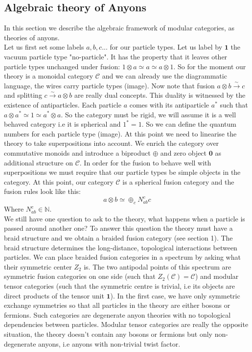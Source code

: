 \documentclass{article}
\begin{document}
\subsection{Algebraic theory of Anyons}
In this section we describe the algebraic framework of modular categories, as theories of anyons. \\
Let us first set some labels $a,b,c...$ for our particle types. Let us label by $\mathbf{1}$ the vacuum particle type "no-particle". It has the property that it leaves other particle types unchanged under fusion: $1 \otimes a \simeq a \simeq a \otimes 1$. So for the moment our theory is a monoidal category $\mathcal{C}$ and we can already use the diagrammatic language, the wires carry particle types (image). Now note that fusion $a \otimes b \xrightarrow{\sim} c$ and splitting $c \xrightarrow{\sim} a \otimes b$ are really dual concepts. This duality is witnessed by the existence of antiparticles. Each particle $a$ comes with its antiparticle $a^*$ such that $a\otimes a^* \simeq 1 \simeq a^* \otimes a$. So the category must be rigid, we will assume it is a well behaved category i.e it is spherical and $1^*=1$. So we can define the quantum numbers for each particle type (image). At this point we need to linearise the theory to take superpositions into account. We enrich the category over commutative monoids and introduce a biproduct $\oplus$ and zero object $\mathbf{0}$ as additional structure on $\mathcal{C}$. In order for the fusion to behave well with superpositions we must require that our particle types be simple objects in the category. At this point, our category $\mathcal{C}$ is a spherical fusion category and the fusion rules look like this:
\begin{equation}
a\otimes b \simeq \oplus_c N_{ab}^c c
\end{equation}
Where $N_{ab}^c \in \mathbb{N}$. \\
We still have one question to ask to the theory, what happens when a particle is passed around another one? To answer this question the theory must have a braid structure and we obtain a braided fusion category (see section 1).
The braid structure determines the long-distance, topological interactions between particles. We can place braided fusion categories in a spectrum by asking what their symmetric center $Z_2$ is. The two antipodal points of this spectrum are symmetric fusion categories on one side (such that $Z_2(\mathcal{C})=\mathcal{C}$) and modular tensor categories (such that the symmetric centre is trivial, i.e its objects are direct products of the tensor unit $\mathbf{1}$). In the first case, we have only symmetric exchange symmetries so that all particles in the theory are either bosons or fermions. Such categories are degenerate anyon theories with no topological dependencies between particles. Modular tensor categories are really the opposite situation, the theory doesn't contain any bosons or fermions but only non-degenerate anyons, i.e anyons with non-trivial twist factor.
\end{document}
